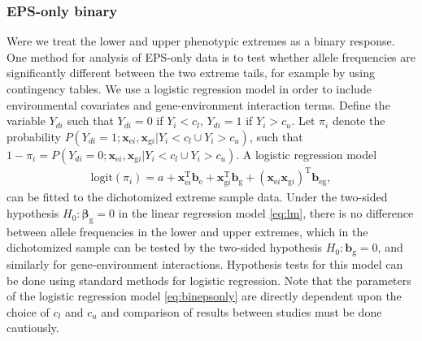 \documentclass[10pt,a4paper]{article}
\def\bbetag{\bm{\beta}_{\text{g}}}
\def\bxgi{\mathbf{x}_{\text{g}i}}
\def\bxei{\mathbf{x}_{\text{e}i}}
\begin{document}
\subsubsection{EPS-only binary}
Were we treat the lower and upper phenotypic extremes as a binary response. One method for analysis of EPS-only data is to test whether allele frequencies are significantly different between the two extreme tails, for example by using contingency tables. We use a logistic regression model in order to include environmental covariates and gene-environment interaction terms. Define the variable $Y_{di}$ such that $Y_{di} = 0$ if $Y_i < c_l$, $Y_{di} = 1$ if $Y_i > c_u$. Let $\pi_i$ denote the probability $P(Y_{di} = 1; \bxei,\bxgi|Y_i < c_l \cup Y_i > c_u)$, such that $1-\pi_i = P(Y_{di} = 0; \bxei,\bxgi|Y_i < c_l \cup Y_i > c_u)$. A logistic regression model
\begin{align}
\text{logit}(\pi_i) = a + \bxei^{\text{T}} \mathbf{b}_{\text{e}} + \bxgi^{\text{T}} \mathbf{b}_{\text{g}} + (\bxei \bxgi)^{\text{T}} \mathbf{b}_{\text{eg}} ,
\label{eq:binepsonly}
\end{align}
can be fitted to the dichotomized extreme sample data. Under the two-sided hypothesis $H_0: \bbetag = 0$ in the linear regression model \eqref{eq:lm}, there is no difference between allele frequencies in the lower and upper extremes, which in the dichotomized sample can be tested by the two-sided hypothesis $H_0: \mathbf{b}_{\text{g}} = 0$, and similarly for gene-environment interactions. Hypothesis tests for this model can be done using standard methods for logistic regression. Note that the parameters of the logistic regression model \eqref{eq:binepsonly} are directly dependent upon the choice of $c_l$ and $c_u$ and comparison of results between studies must be done cautiously. 
\end{document}
